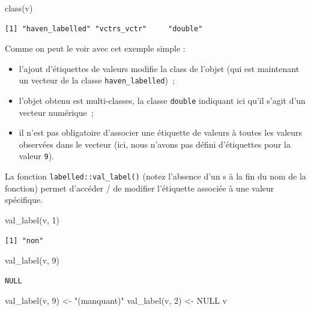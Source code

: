 \documentclass[
  letterpaper,
  DIV=11,
  numbers=noendperiod,
  oneside]{scrreprt}
\newenvironment{Shaded}{\begin{snugshade}}{\end{snugshade}}
\newcommand{\ConstantTok}[1]{\textcolor[rgb]{0.56,0.35,0.01}{#1}}
\newcommand{\DecValTok}[1]{\textcolor[rgb]{0.68,0.00,0.00}{#1}}
\newcommand{\FunctionTok}[1]{\textcolor[rgb]{0.28,0.35,0.67}{#1}}
\newcommand{\NormalTok}[1]{\textcolor[rgb]{0.00,0.23,0.31}{#1}}
\newcommand{\OtherTok}[1]{\textcolor[rgb]{0.00,0.23,0.31}{#1}}
\newcommand{\StringTok}[1]{\textcolor[rgb]{0.13,0.47,0.30}{#1}}
\providecommand{\tightlist}{%
  \setlength{\itemsep}{0pt}\setlength{\parskip}{0pt}}\usepackage{longtable,booktabs,array}
\begin{document}
\begin{Shaded}
\begin{Highlighting}[]
\FunctionTok{class}\NormalTok{(v)}
\end{Highlighting}
\end{Shaded}

\begin{verbatim}
[1] "haven_labelled" "vctrs_vctr"     "double"        
\end{verbatim}

Comme on peut le voir avec cet exemple simple :

\begin{itemize}
\tightlist
\item
  l'ajout d'étiquettes de valeurs modifie la class de l'objet (qui est
  maintenant un vecteur de la classe \texttt{haven\_labelled})~;
\item
  l'objet obtenu est multi-classes, la classe \texttt{double} indiquant
  ici qu'il s'agit d'un vecteur numérique~;
\item
  il n'est pas obligatoire d'associer une étiquette de valeurs à toutes
  les valeurs observées dans le vecteur (ici, nous n'avons pas défini
  d'étiquettes pour la valeur \texttt{9}).
\end{itemize}

La fonction \texttt{labelled::val\_label()} (notez l'absence d'un s à la
fin du nom de la fonction) permet d'accéder / de modifier l'étiquette
associée à une valeur spécifique.

\begin{Shaded}
\begin{Highlighting}[]
\FunctionTok{val\_label}\NormalTok{(v, }\DecValTok{1}\NormalTok{)}
\end{Highlighting}
\end{Shaded}

\begin{verbatim}
[1] "non"
\end{verbatim}

\begin{Shaded}
\begin{Highlighting}[]
\FunctionTok{val\_label}\NormalTok{(v, }\DecValTok{9}\NormalTok{)}
\end{Highlighting}
\end{Shaded}

\begin{verbatim}
NULL
\end{verbatim}

\begin{Shaded}
\begin{Highlighting}[]
\FunctionTok{val\_label}\NormalTok{(v, }\DecValTok{9}\NormalTok{) }\OtherTok{\textless{}{-}} \StringTok{"(manquant)"}
\FunctionTok{val\_label}\NormalTok{(v, }\DecValTok{2}\NormalTok{) }\OtherTok{\textless{}{-}} \ConstantTok{NULL}
\NormalTok{v}
\end{Highlighting}
\end{Shaded}
\end{document}
